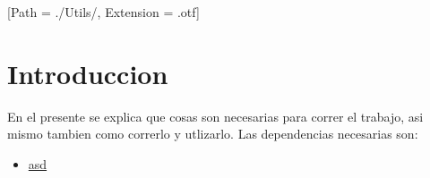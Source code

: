 



\def\verObs{0}


\setmainfont{AvenirLTStd-Roman}[Path = ./Utils/, Extension = .otf]



\setmainfont{Calibri}




\section{Introduccion}
En el presente se explica que cosas son necesarias para correr el trabajo, asi mismo tambien como correrlo y utlizarlo.
Las dependencias necesarias son:
\begin{itemize}
\item \href{https://petercorke.com/toolboxes/robotics-toolbox/}{asd}
\end{itemize}
